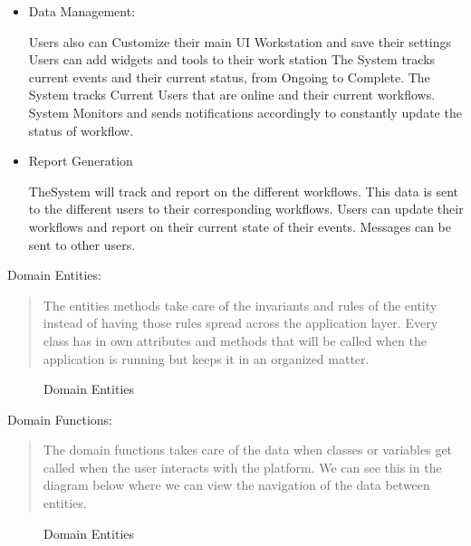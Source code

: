 \documentclass{article}[draft]
\begin{document}
\begin{itemize}
    \item Data Management:

    \vspace{5pt}
    Users also can Customize their main UI Workstation and save their settings
    Users can add widgets and tools to their
    work station
    The System tracks current events and their current status, from Ongoing to Complete.
    The System tracks Current Users that are online and their current workflows.
    System Monitors and sends notifications accordingly to constantly update the status of workflow.
\end{itemize}

\begin{itemize}
    \item Report Generation

    \vspace{5pt}
    TheSystem will track and report on the different workflows.
    This data is sent to the different users to their corresponding workflows.
    Users can
    update their workflows and report on their current state of their events.
    Messages can be sent to other users.
\end{itemize}
\vspace{5pt}
Domain Entities:
\begin{quotation}
    The entities methods take care of the invariants and rules of the entity instead of having those rules spread across the application layer.
    Every class has in own attributes and methods that will be called when the application is running but keeps it in an organized matter.
\end{quotation}
\bigbreak
\begin{figure}[ht!]
    \centering
    \caption{Domain Entities}
    \label{fig:figure}
\end{figure}
\bigbreak
Domain Functions:
\begin{quotation}
    The domain functions takes care of the data when classes or variables get called when the user interacts with the platform.
    We can see this in the diagram below where we can view the navigation of the data between entities.
\end{quotation}
\bigbreak
\begin{figure}[ht!]
    \centering
    \caption{Domain Entities}
    \label{fig:figure2}
\end{figure}
\end{document}

